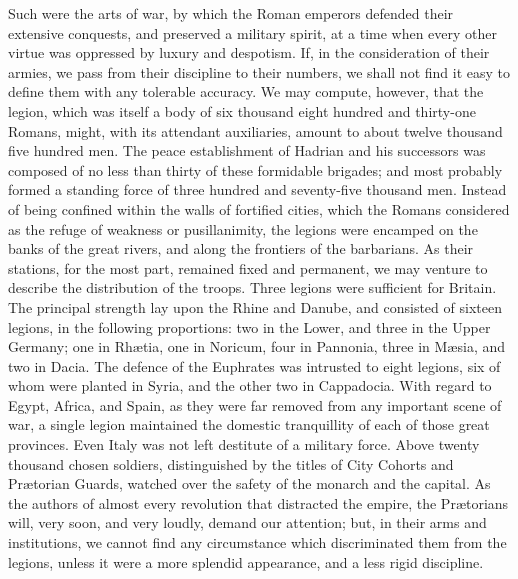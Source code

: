 


Such were the arts of war, by which the Roman emperors defended
their extensive conquests, and preserved a military spirit, at a
time when every other virtue was oppressed by luxury and
despotism. If, in the consideration of their armies, we pass from
their discipline to their numbers, we shall not find it easy to
define them with any tolerable accuracy. We may compute, however,
that the legion, which was itself a body of six thousand eight
hundred and thirty-one Romans, might, with its attendant
auxiliaries, amount to about twelve thousand five hundred men.
The peace establishment of Hadrian and his successors was
composed of no less than thirty of these formidable brigades; and
most probably formed a standing force of three hundred and
seventy-five thousand men. Instead of being confined within the
walls of fortified cities, which the Romans considered as the
refuge of weakness or pusillanimity, the legions were encamped on
the banks of the great rivers, and along the frontiers of the
barbarians. As their stations, for the most part, remained fixed
and permanent, we may venture to describe the distribution of the
troops. Three legions were sufficient for Britain. The principal
strength lay upon the Rhine and Danube, and consisted of sixteen
legions, in the following proportions: two in the Lower, and
three in the Upper Germany; one in Rhætia, one in Noricum, four
in Pannonia, three in Mæsia, and two in Dacia. The defence of the
Euphrates was intrusted to eight legions, six of whom were
planted in Syria, and the other two in Cappadocia. With regard to
Egypt, Africa, and Spain, as they were far removed from any
important scene of war, a single legion maintained the domestic
tranquillity of each of those great provinces. Even Italy was not
left destitute of a military force. Above twenty thousand chosen
soldiers, distinguished by the titles of City Cohorts and
Prætorian Guards, watched over the safety of the monarch and the
capital. As the authors of almost every revolution that
distracted the empire, the Prætorians will, very soon, and very
loudly, demand our attention; but, in their arms and
institutions, we cannot find any circumstance which discriminated
them from the legions, unless it were a more splendid appearance,
and a less rigid discipline.\footnotemark[65]

